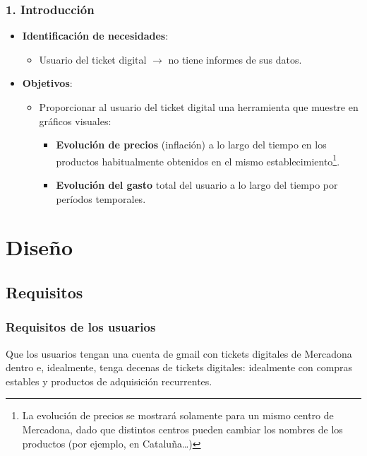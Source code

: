 \documentclass{beamer}
\begin{document}
\begin{frame}
	\frametitle{1. Introducción}
	\begin{itemize}
		\item \textbf{Identificación de necesidades}:
		\begin{itemize}
			\item Usuario del ticket digital $\rightarrow$ no tiene informes de sus datos.
		\end{itemize}
		
		\item \textbf{Objetivos}:
		\begin{itemize}
			\item Proporcionar al usuario del ticket digital una herramienta que muestre en gráficos visuales:
			\begin{itemize}
				\item \textbf{Evolución de precios} (inflación) a lo largo del tiempo en los productos habitualmente obtenidos en el mismo establecimiento\footnote{La evolución de precios se mostrará solamente para un mismo centro de Mercadona, dado que distintos centros pueden cambiar los nombres de los productos (por ejemplo, en Cataluña…)}.
				\item \textbf{Evolución del gasto} total del usuario a lo largo del tiempo por períodos temporales.
			\end{itemize}
		\end{itemize}
	\end{itemize}
\end{frame}

			
			

	
	
	
	
	
		\section{Diseño}
	
	


			
			\subsection{Requisitos}
				\begin{frame}
					\frametitle{Requisitos de los usuarios}
					
					Que los usuarios tengan una cuenta de gmail con tickets digitales de Mercadona dentro e, idealmente, tenga decenas de tickets digitales: idealmente con compras estables y productos de adquisición recurrentes.
		
				\end{frame}
				
\end{document}
